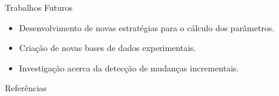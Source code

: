 \documentclass[10pt]{beamer}
\begin{document}
\begin{frame}{Trabalhos Futuros}
    \begin{itemize}
        \item Desenvolvimento de novas estratégias para o cálculo dos parâmetros.
        \item Criação de novas bases de dados experimentais.
        \item Investigação acerca da detecção de mudanças incrementais.
    \end{itemize}
\end{frame}

\begin{frame}[allowframebreaks]{Referências}

  
  

\end{frame}
\end{document}
